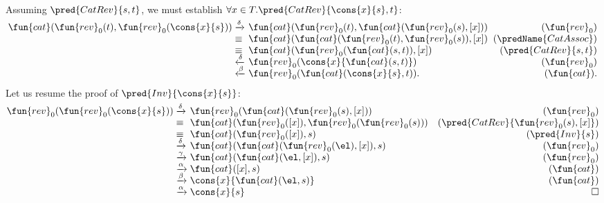 \noindent Assuming
\(\pred{CatRev}{s,t}\), we must
establish \(\forall x \in T.\pred{CatRev}{\cons{x}{s},t}\):
 
\begin{equation*}
\begin{array}{@{}r@{\;}l@{\;}l@{\;\;}r@{}}
  \fun{cat}(\fun{rev}_0(t),\fun{rev}_0(\cons{x}{s}))
& \xrightarrow{\smash{\delta}}
& \fun{cat}(\fun{rev}_0(t),\fun{cat}(\fun{rev}_0(s),[x]))
& (\fun{rev}_0)\\
& \equiv
& \fun{cat}(\fun{cat}(\fun{rev}_0(t),\fun{rev}_0(s)),[x])
& (\predName{CatAssoc})\\
& \equiv
& \fun{cat}(\fun{rev}_0(\fun{cat}(s,t)),[x])
& (\pred{CatRev}{s,t})\\
& \xleftarrow{\smash{\delta}}
& \fun{rev}_0(\cons{x}{\fun{cat}(s,t)})
& (\fun{rev}_0)\\
& \xleftarrow{\smash{\beta}}
& \fun{rev}_0(\fun{cat}(\cons{x}{s},t)).
& (\fun{cat}). %
\end{array}
\end{equation*}
Let us resume the proof of
\(\pred{Inv}{\cons{x}{s}}\):
\begin{equation*}
\begin{array}{@{}r@{\;}l@{\;}l@{\quad}r@{}}
  \fun{rev}_0(\fun{rev}_0(\cons{x}{s}))
& \xrightarrow{\smash{\delta}}
& \fun{rev}_0(\fun{cat}(\fun{rev}_0(s),[x]))
& (\fun{rev}_0)\\
& \equiv
& \fun{cat}(\fun{rev}_0([x]),\fun{rev}_0(\fun{rev}_0(s)))
& (\pred{CatRev}{\fun{rev}_0(s),[x]})\\
& \equiv
& \fun{cat}(\fun{rev}_0([x]),s)
& (\pred{Inv}{s})\\
& \xrightarrow{\smash{\delta}}
& \fun{cat}(\fun{cat}(\fun{rev}_0(\el),[x]),s)
& (\fun{rev}_0)\\
& \xrightarrow{\smash{\gamma}}
& \fun{cat}(\fun{cat}(\el,[x]),s)
& (\fun{rev}_0)\\
& \xrightarrow{\smash{\alpha}}
& \fun{cat}([x],s)
& (\fun{cat}) \\
& \xrightarrow{\smash{\beta}}
& \cons{x}{\fun{cat}(\el,s)}
& (\fun{cat})\\
& \xrightarrow{\smash{\alpha}}
& \cons{x}{s}
& \hfill \Box
\end{array}
\end{equation*}

